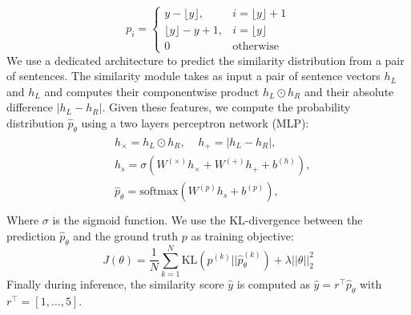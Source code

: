\begin{equation*}
p_{i} = \left\{
\begin{array}{ll}
y - \lfloor{y}\rfloor, & i = \lfloor{y}\rfloor + 1 \\
\lfloor{y}\rfloor - y + 1, & i = \lfloor{y}\rfloor \\
0 & \text{otherwise}
\end{array} \right.
\end{equation*}
We use a dedicated architecture to predict the similarity distribution from a pair of sentences. The similarity module takes as input a pair of sentence vectors $h_{L} $ and $h_{L}$ and computes their component\-wise product $h_{L} \odot h_{R}$ and their absolute difference $|h_{L} - h_{R}|$. Given these features, we compute the probability distribution  $\hat{p}_{\theta}$ using a two layers perceptron network (MLP):
\begin{align}
\begin{split}
&h_{\times}=h_L\odot h_R, ~~~~~h_{+} = |h_L - h_R |, \\
&h_s = \sigma (W^{(\times)}h_{\times} + W^{(+)}h_{+} + b^{(h)}), \\
&\hat{p}_{\theta} = \text{softmax}(W^{(p)}h_s + b^{(p)}),\\
\end{split}
\end{align}
Where $\sigma$ is the sigmoid function. We use the KL-divergence between the prediction $\hat{p}_{\theta}$ and the ground truth $p$ as training objective:
\begin{equation}
J(\theta) = \frac{1}{N}\sum_{k=1}^{N}\text{KL}(p^{(k)} || \hat{p}_{\theta}^{(k)}) + \lambda||\theta||_{2}^{2}
\end{equation}
Finally during inference, the similarity score $\hat{y}$ is computed as $\hat{y} = r^{\intercal} \hat{p}_{\theta}$ with $r^{\intercal} = [1, \dots, 5]$. 


